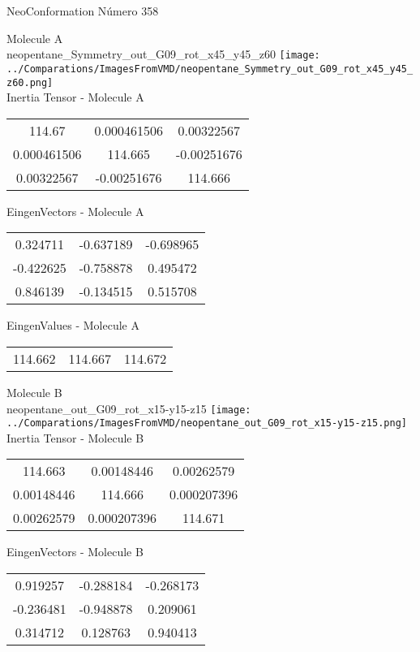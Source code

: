 \vtab[-2cm]
\begin{center}
{\large NeoConformation \tab Número 358}
\end{center}
\begin{multicols}{2}
\begin{center}

Molecule A \\ 
neopentane\_Symmetry\_out\_G09\_rot\_x45\_y45\_z60
\texttt{[image: ../Comparations/ImagesFromVMD/neopentane\_Symmetry\_out\_G09\_rot\_x45\_y45\_z60.png]}
\\
Inertia Tensor - Molecule A \\
\vtab

\begin{tabular}{|c c c|}
114.67	 & 	0.000461506	 & 	0.00322567	 \\
0.000461506	 & 	114.665	 & 	-0.00251676	 \\
0.00322567	 & 	-0.00251676	 & 	114.666
\end{tabular}

\vtab
 EingenVectors - Molecule A     \\
\vtab
\begin{tabular}{|c c c|}
0.324711	 & 	-0.637189	 & 	-0.698965	 \\
-0.422625	 & 	-0.758878	 & 	0.495472	 \\
0.846139	 & 	-0.134515	 & 	0.515708
\end{tabular}

\vtab
 EingenValues - Molecule A     \\
\vtab
\begin{tabular}{|c c c|}
114.662	 & 	114.667	 & 	114.672	 \\
\end{tabular}
\columnbreak

Molecule B \\ 
neopentane\_out\_G09\_rot\_x15-y15-z15
\texttt{[image: ../Comparations/ImagesFromVMD/neopentane\_out\_G09\_rot\_x15-y15-z15.png]}
\\
Inertia Tensor - Molecule B \\
\vtab

\begin{tabular}{|c c c|}
114.663	 & 	0.00148446	 & 	0.00262579	 \\
0.00148446	 & 	114.666	 & 	0.000207396	 \\
0.00262579	 & 	0.000207396	 & 	114.671
\end{tabular}

\vtab
 EingenVectors - Molecule B     \\
\vtab
\begin{tabular}{|c c c|}
0.919257	 & 	-0.288184	 & 	-0.268173	 \\
-0.236481	 & 	-0.948878	 & 	0.209061	 \\
0.314712	 & 	0.128763	 & 	0.940413
\end{tabular}


\end{center}
\end{multicols}
